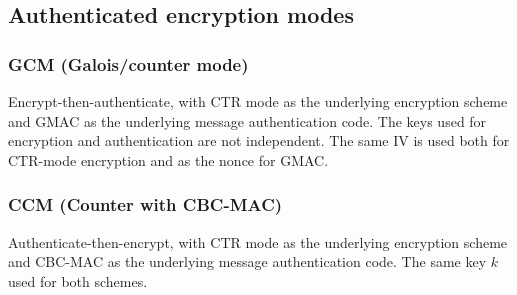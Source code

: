 \documentclass[12pt]{article}
\begin{document}
\subsection{Authenticated encryption modes}
\subsubsection{GCM (Galois/counter mode)}
Encrypt-then-authenticate, with CTR mode as the underlying encryption scheme and GMAC as the underlying message authentication code. The keys used for encryption and authentication are not independent. The same IV is used both for CTR-mode encryption and as the nonce for GMAC.

\subsubsection{CCM (Counter with CBC-MAC)}
Authenticate-then-encrypt, with CTR mode as the underlying encryption scheme and CBC-MAC as the underlying message authentication code. The same key $k$ used for both schemes.
\end{document}
